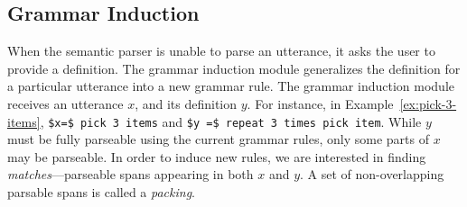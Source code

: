 \documentclass[letterpaper, 10 pt, conference]{ieeeconf}  %
\begin{document}



\subsection{Grammar Induction}
\label{subsec:grammarInduction}

When the semantic parser is unable to parse an utterance,
it asks the user to provide a definition.
The grammar induction module generalizes the definition for a particular
utterance into a new grammar rule.
The grammar induction module receives an utterance $x$, and its definition $y$.
For instance, in Example~\ref{ex:pick-3-items}, \lstinline{$x=$ pick 3 items} and
\lstinline{$y =$ repeat 3 times pick item}.
While $y$ must be fully parseable using the current grammar rules, only some parts of $x$ may be parseable.
In order to induce new rules, we are interested in finding \textit{matches}---parseable spans appearing in both $x$ and $y$.
A set of non-overlapping parsable spans is called a \emph{packing}.
\end{document}
